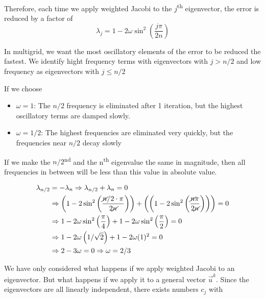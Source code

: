 Therefore, each time we apply weighted Jacobi to the $j$\textsuperscript{th}
eigenvector, the error is reduced by a factor of
\begin{equation*}
\lambda_j= 1-2\omega \sin^2 \left( \frac{j\pi}{2n}\right)
\end{equation*}

\begin{center}
    
\end{center}

In multigrid, we want the most oscillatory elements of the error to be reduced
the fastest. We identify hight frequency terms with eigenvectors with $j>n/2$
and low frequency as eigenvectors with $j\leq n/2$

If we choose
\begin{itemize}[{label={}}]
\item $\omega = 1$: The $n/2$ frequency is eliminated after 1 iteration, but
  the highest oscillatory terms are damped slowly.
  \item $\omega=1/2$:  The highest frequencies are eliminated very quickly, but the
  frequencies near $n/2$ decay slowly
\end{itemize}

If we make the $n/2$\textsuperscript{nd} and the n\textsuperscript{th}
eigenvalue the same in magnitude, then all frequencies in between will be less
than this value in absolute value. 


\begin{align*}
  \lambda_{n/2} &=  - \lambda_n \Rightarrow \lambda_{n/2} + \lambda_n = 0 \\
                &\Rightarrow \left( 1-2\sin^2 \left( \frac{\cancel{n}/2 \cdot \pi}{2\cancel{n}} \right) \right)
                  + \left(  \left( 1-2\sin^2 \left( \frac{\cancel{n} \pi}{2\cancel{n}} \right) \right)\right) = 0 \\
                &\Rightarrow 1-2\omega\sin^2\left( \frac{\pi}{4} \right) + 1 - 2\omega\sin^2\left( \frac{\pi}{2}\right) = 0 \\
                &\Rightarrow 1-2\omega\left( 1/\sqrt{2} \right) + 1 - 2\omega (1)^2 = 0 \\
                &\Rightarrow 2 - 3 \omega = 0 \Rightarrow \omega = 2/3
\end{align*}

We have only considered what happens if we apply weighted Jacobi to an
eigenvector. But what happens if we apply it to a general vector $\vec{u}^k$.
Since the eigenvectors are all linearly independent, there exists numbers $c_j$
with

